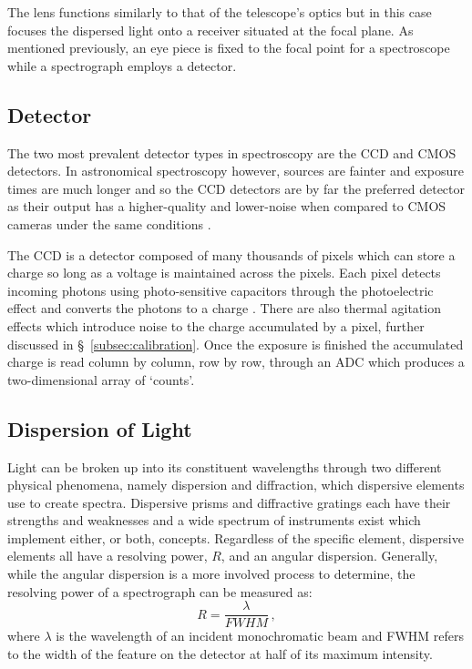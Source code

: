 The lens functions similarly to that of the telescope's optics but in this case focuses the dispersed light onto a receiver situated at the focal plane. As mentioned previously, an eye piece is fixed to the focal point for a spectroscope while a spectrograph employs a detector.

\subsection{Detector}

The two most prevalent detector types in spectroscopy are the \gls{CCD} and \gls{CMOS} detectors. In astronomical spectroscopy however, sources are fainter and exposure times are much longer and so the \gls{CCD} detectors are by far the preferred detector as their output has a higher-quality and lower-noise when compared to \gls{CMOS} cameras under the same conditions \citep{CCDvsCMOS}.

The \gls{CCD} is a detector composed of many thousands of pixels which can store a charge so long as a voltage is maintained across the pixels. Each pixel detects incoming photons using photo-sensitive capacitors through the photoelectric effect and converts the photons to a charge \citep{CCDastronomy}. There are also thermal agitation effects which introduce noise to the charge accumulated by a pixel, further discussed in \S~\ref{subsec:calibration}. Once the exposure is finished the accumulated charge is read column by column, row by row, through an \gls{ADC}  which produces a two-dimensional array of `counts'.


\subsection{Dispersion of Light} \label{subsec:dispersion}

Light can be broken up into its constituent wavelengths through two different physical phenomena, namely dispersion and diffraction, which dispersive elements use to create spectra. Dispersive prisms and diffractive gratings each have their strengths and weaknesses and a wide spectrum of instruments exist which implement either, or both, concepts. Regardless of the specific element, dispersive elements all have a resolving power, $R$, and an angular dispersion. Generally, while the angular dispersion is a more involved process to determine, the resolving power of a spectrograph can be measured as:
\begin{equation}
    R = \frac{\lambda}{FWHM}\,,\label{eq:resolving_power}
\end{equation}
where $\lambda$ is the wavelength of an incident monochromatic beam and \gls{FWHM} refers to the width of the feature on the detector at half of its maximum intensity.

